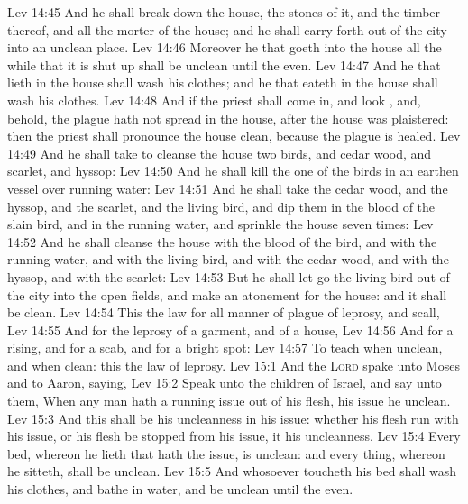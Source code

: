 \vs Lev 14:45 And he shall break down the house, the stones of it, and the timber thereof, and all the morter of the house; and he shall carry  forth out of the city into an unclean place.
\vs Lev 14:46 Moreover he that goeth into the house all the while that it is shut up shall be unclean until the even.
\vs Lev 14:47 And he that lieth in the house shall wash his clothes; and he that eateth in the house shall wash his clothes.
\vs Lev 14:48 And if the priest shall come in, and look , and, behold, the plague hath not spread in the house, after the house was plaistered: then the priest shall pronounce the house clean, because the plague is healed.
\vs Lev 14:49 And he shall take to cleanse the house two birds, and cedar wood, and scarlet, and hyssop:
\vs Lev 14:50 And he shall kill the one of the birds in an earthen vessel over running water:
\vs Lev 14:51 And he shall take the cedar wood, and the hyssop, and the scarlet, and the living bird, and dip them in the blood of the slain bird, and in the running water, and sprinkle the house seven times:
\vs Lev 14:52 And he shall cleanse the house with the blood of the bird, and with the running water, and with the living bird, and with the cedar wood, and with the hyssop, and with the scarlet:
\vs Lev 14:53 But he shall let go the living bird out of the city into the open fields, and make an atonement for the house: and it shall be clean.
\vs Lev 14:54 This  the law for all manner of plague of leprosy, and scall,
\vs Lev 14:55 And for the leprosy of a garment, and of a house,
\vs Lev 14:56 And for a rising, and for a scab, and for a bright spot:
\vs Lev 14:57 To teach when  unclean, and when  clean: this  the law of leprosy.
\vs Lev 15:1 And the \textsc{Lord} spake unto Moses and to Aaron, saying,
\vs Lev 15:2 Speak unto the children of Israel, and say unto them, When any man hath a running issue out of his flesh,  his issue he  unclean.
\vs Lev 15:3 And this shall be his uncleanness in his issue: whether his flesh run with his issue, or his flesh be stopped from his issue, it  his uncleanness.
\vs Lev 15:4 Every bed, whereon he lieth that hath the issue, is unclean: and every thing, whereon he sitteth, shall be unclean.
\vs Lev 15:5 And whosoever toucheth his bed shall wash his clothes, and bathe  in water, and be unclean until the even.
